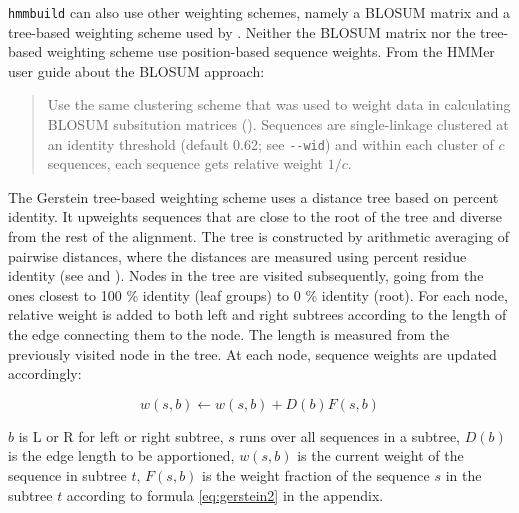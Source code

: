 \texttt{hmmbuild} can also use other weighting schemes, namely a BLOSUM matrix
and a tree-based weighting scheme used by \cite{gerstein1992}. Neither the
BLOSUM matrix nor the tree-based weighting scheme use position-based sequence
weights. From the HMMer user guide about the BLOSUM approach:

\begin{quote}
	Use the same clustering scheme that was used to weight data in calculating
	BLOSUM subsitution matrices (\cite{henikoff1994}). Sequences are
	single-linkage clustered at an identity threshold (default 0.62; see
	\lstinline{--wid}) and within each cluster of $c$ sequences, each sequence
	gets relative weight $1/c$. 
\end{quote}

The Gerstein tree-based weighting scheme uses a distance tree based on percent
identity. It upweights sequences that are close to the root of the tree and
diverse from the rest of the alignment. The tree is constructed by arithmetic
averaging of pairwise distances, where the distances are measured using percent
residue identity (see \cite{Nei1987} and \cite{Sneath1973}). Nodes in the tree
are visited subsequently, going from the ones closest to 100 \% identity (leaf
groups) to 0 \% identity (root). For each node, relative weight is added to both
left and right subtrees according to the length of the edge connecting them to
the node. The length is measured from the previously visited node in the tree.
At each node, sequence weights are updated accordingly:

\begin{equation}
	w(s,b) \leftarrow w(s,b) + D(b)F(s,b)
	\label{eq:gerstein}
\end{equation}

$b$ is L or R for left or right subtree, $s$ runs over all sequences in a
subtree, $D(b)$ is the edge length to be apportioned, $w(s,b)$ is the current
weight of the sequence in subtree $t$, $F(s,b)$ is the weight fraction of the
sequence $s$ in the subtree $t$ according to formula \ref{eq:gerstein2} in the
appendix.

